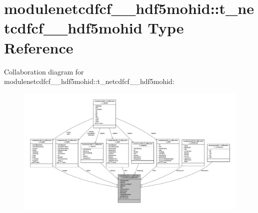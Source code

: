 \hypertarget{structmodulenetcdfcf__2__hdf5mohid_1_1t__netcdfcf__2__hdf5mohid}{}\section{modulenetcdfcf\+\_\+\_\+hdf5mohid\+:\+:t\+\_\+netcdfcf\+\_\+\_\+hdf5mohid Type Reference}
\label{structmodulenetcdfcf__2__hdf5mohid_1_1t__netcdfcf__2__hdf5mohid}


Collaboration diagram for modulenetcdfcf\+\_\+\_\+hdf5mohid\+:\+:t\+\_\+netcdfcf\+\_\+\_\+hdf5mohid\+:\nopagebreak
\begin{figure}[H]
\begin{center}
\leavevmode
\includegraphics[width=350pt]{structmodulenetcdfcf__2__hdf5mohid_1_1t__netcdfcf__2__hdf5mohid__coll__graph}
\end{center}
\end{figure}
